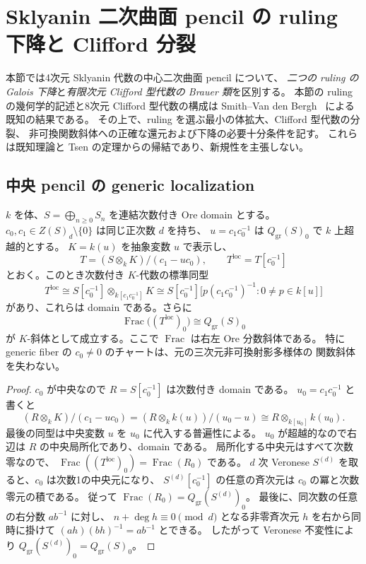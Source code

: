 \section{Sklyanin 二次曲面 pencil の ruling 下降と Clifford 分裂}
\label{sec:sklyanin-ruling-descent}

本節では4次元 Sklyanin 代数の中心二次曲面 pencil について、
\emph{二つの ruling の Galois 下降}と\emph{有限次元 Clifford 型代数の Brauer 類}を区別する。
本節の ruling の幾何学的記述と8次元 Clifford 型代数の構成は
Smith--Van den Bergh~\cite[第5節・第7節・定理10.2]{SmithVdB} による既知の結果である。
その上で、ruling を選ぶ最小の体拡大、Clifford 型代数の分裂、
非可換関数斜体への正確な還元および下降の必要十分条件を記す。
これらは既知理論と Tsen の定理からの帰結であり、新規性を主張しない。

\subsection{中央 pencil の generic localization}
\begin{lemma}\label{lem:central-pencil-generic-chart}
$k$ を体、$S=\bigoplus_{n\ge0}S_n$ を連結次数付き Ore domain とする。
$c_0,c_1\in Z(S)_d\setminus\{0\}$ は同じ正次数 $d$ を持ち、
$u=c_1c_0^{-1}$ は $Q_{\mathrm{gr}}(S)_0$ で $k$ 上超越的とする。
$K=k(u)$ を抽象変数 $u$ で表示し、
\[
 T=(S\otimes_k K)/(c_1-u c_0),\qquad
 T^{\mathrm{loc}}=T[c_0^{-1}]
\]
とおく。このとき次数付き $K$-代数の標準同型
\[
 T^{\mathrm{loc}}\cong
 S[c_0^{-1}]\otimes_{k[c_1c_0^{-1}]}K
 \cong S[c_0^{-1}]\bigl[p(c_1c_0^{-1})^{-1}:0\ne p\in k[u]\bigr]
\]
があり、これらは domain である。さらに
\[
 \operatorname{Frac}\bigl((T^{\mathrm{loc}})_0\bigr)
 \cong Q_{\mathrm{gr}}(S)_0
\]
が $K$-斜体として成立する。ここで $\operatorname{Frac}$ は右左 Ore 分数斜体である。
特に generic fiber の $c_0\ne0$ のチャートは、元の三次元非可換射影多様体の
関数斜体を失わない。
\end{lemma}
\begin{proof}
$c_0$ が中央なので $R=S[c_0^{-1}]$ は次数付き domain である。
$u_0=c_1c_0^{-1}$ と書くと
\[
 (R\otimes_k K)/(c_1-u c_0)
 =(R\otimes_k k(u))/(u_0-u)
 \cong R\otimes_{k[u_0]}k(u_0).
\]
最後の同型は中央変数 $u$ を $u_0$ に代入する普遍性による。
$u_0$ が超越的なので右辺は $R$ の中央局所化であり、domain である。
局所化する中央元はすべて次数零なので、
$\operatorname{Frac}((T^{\mathrm{loc}})_0)=\operatorname{Frac}(R_0)$ である。
$d$ 次 Veronese $S^{(d)}$ を取ると、$c_0$ は次数1の中央元になり、
$S^{(d)}[c_0^{-1}]$ の任意の斉次元は $c_0$ の冪と次数零元の積である。
従って $\operatorname{Frac}(R_0)=Q_{\mathrm{gr}}(S^{(d)})_0$。
最後に、同次数の任意の右分数 $ab^{-1}$ に対し、
$n+\deg h\equiv0\pmod d$ となる非零斉次元 $h$ を右から同時に掛けて
$(ah)(bh)^{-1}=ab^{-1}$ とできる。
したがって Veronese 不変性により $Q_{\mathrm{gr}}(S^{(d)})_0=Q_{\mathrm{gr}}(S)_0$。
\end{proof}

